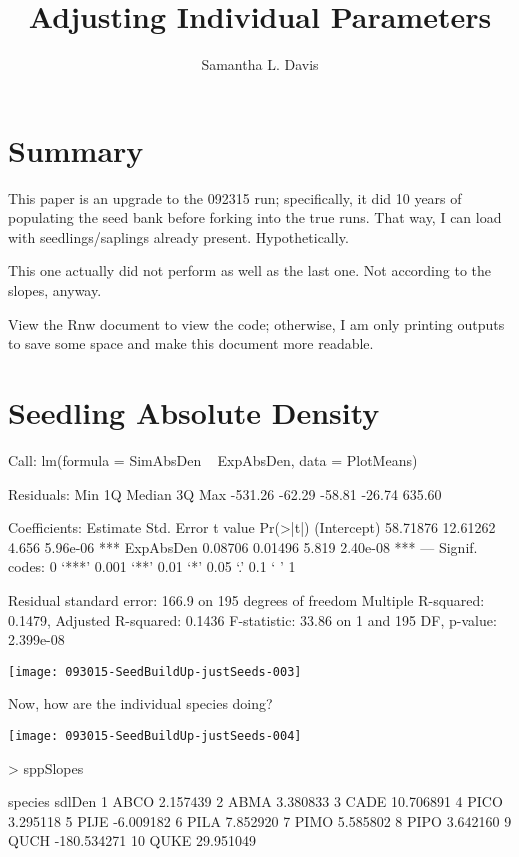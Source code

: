 \documentclass{article}
\begin{document}


\title{Adjusting Individual Parameters}
\author{Samantha L. Davis}

\maketitle

\section{Summary}
This paper is an upgrade to the 092315 run; specifically, it did 10 years of populating the seed bank before forking into the true runs. That way, I can load with seedlings/saplings already present. Hypothetically.

This one actually did not perform as well as the last one. Not according to the slopes, anyway.

View the Rnw document to view the code; otherwise, I am only printing outputs to save some space and make this document more readable.





\newpage

\section{Seedling Absolute Density}
\begin{Schunk}
\begin{Soutput}
Call:
lm(formula = SimAbsDen ~ ExpAbsDen, data = PlotMeans)

Residuals:
    Min      1Q  Median      3Q     Max 
-531.26  -62.29  -58.81  -26.74  635.60 

Coefficients:
            Estimate Std. Error t value Pr(>|t|)    
(Intercept) 58.71876   12.61262   4.656 5.96e-06 ***
ExpAbsDen    0.08706    0.01496   5.819 2.40e-08 ***
---
Signif. codes:  0 ‘***’ 0.001 ‘**’ 0.01 ‘*’ 0.05 ‘.’ 0.1 ‘ ’ 1

Residual standard error: 166.9 on 195 degrees of freedom
Multiple R-squared:  0.1479,	Adjusted R-squared:  0.1436 
F-statistic: 33.86 on 1 and 195 DF,  p-value: 2.399e-08
\end{Soutput}
\end{Schunk}
\texttt{[image: 093015-SeedBuildUp-justSeeds-003]}

Now, how are the individual species doing?

\texttt{[image: 093015-SeedBuildUp-justSeeds-004]}
\begin{Schunk}
\begin{Sinput}
>   sppSlopes
\end{Sinput}
\begin{Soutput}
   species      sdlDen
1     ABCO    2.157439
2     ABMA    3.380833
3     CADE   10.706891
4     PICO    3.295118
5     PIJE   -6.009182
6     PILA    7.852920
7     PIMO    5.585802
8     PIPO    3.642160
9     QUCH -180.534271
10    QUKE   29.951049
\end{Soutput}
\end{Schunk}
\end{document}
